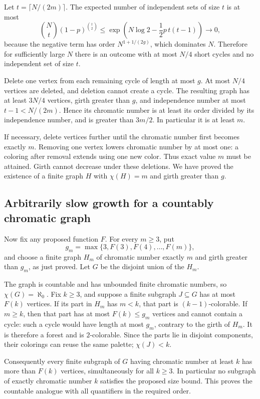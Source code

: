 Let $t=\lceil N/(2m)\rceil$. The expected number of independent sets of size $t$ is at most
\[
\binom Nt(1-p)^{\binom t2}
\leq \exp\left(N\log2-\frac12p\,t(t-1)\right)\longrightarrow0,
\]
because the negative term has order $N^{1+1/(2g)}$, which dominates $N$. Therefore for sufficiently large $N$ there is an outcome with at most $N/4$ short cycles and no independent set of size $t$.

Delete one vertex from each remaining cycle of length at most $g$. At most $N/4$ vertices are deleted, and deletion cannot create a cycle. The resulting graph has at least $3N/4$ vertices, girth greater than $g$, and independence number at most $t-1<N/(2m)$. Hence its chromatic number is at least its order divided by its independence number, and is greater than $3m/2$. In particular it is at least $m$.

If necessary, delete vertices further until the chromatic number first becomes exactly $m$. Removing one vertex lowers chromatic number by at most one: a coloring after removal extends using one new color. Thus exact value $m$ must be attained. Girth cannot decrease under these deletions. We have proved the existence of a finite graph $H$ with $\chi(H)=m$ and girth greater than $g$.

\subsection{Arbitrarily slow growth for a countably chromatic graph}
Now fix any proposed function $F$. For every $m\geq3$, put
\[
g_m=\max\{3,F(3),F(4),\ldots,F(m)\},
\]
and choose a finite graph $H_m$ of chromatic number exactly $m$ and girth greater than $g_m$, as just proved. Let $G$ be the disjoint union of the $H_m$.

The graph is countable and has unbounded finite chromatic numbers, so $\chi(G)=\aleph_0$. Fix $k\geq3$, and suppose a finite subgraph $J\subseteq G$ has at most $F(k)$ vertices. If its part in $H_m$ has $m<k$, that part is $(k-1)$-colorable. If $m\geq k$, then that part has at most $F(k)\leq g_m$ vertices and cannot contain a cycle: such a cycle would have length at most $g_m$, contrary to the girth of $H_m$. It is therefore a forest and is $2$-colorable. Since the parts lie in disjoint components, their colorings can reuse the same palette; $\chi(J)<k$.

Consequently every finite subgraph of $G$ having chromatic number at least $k$ has more than $F(k)$ vertices, simultaneously for all $k\geq3$. In particular no subgraph of exactly chromatic number $k$ satisfies the proposed size bound. This proves the countable analogue with all quantifiers in the required order.

